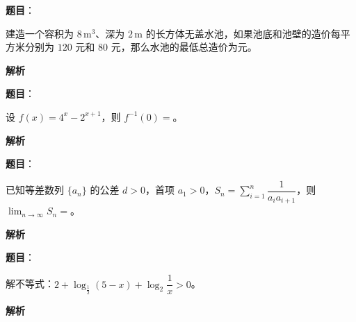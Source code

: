 \begin{answer}

\textbf{题目}：

建造一个容积为 $8\,\mathrm m^3$、深为 $2\,\mathrm m$ 的长方体无盖水池，如果池底和池壁的造价每平方米分别为 $120$ 元和 $80$ 元，那么水池的最低总造价为\underline{\qquad\qquad}元。

\textbf{解析}


\end{answer}
\begin{answer}

\textbf{题目}：

设 $f(x)=4^x-2^{x+1}$，则 $f^{-1}(0)=$\underline{\qquad\qquad}。

\textbf{解析}


\end{answer}
\begin{answer}

\textbf{题目}：

已知等差数列 $\{a_n\}$ 的公差 $d>0$，首项 $a_1>0$，$S_n=\displaystyle\sum_{i=1}^{n}\dfrac1{a_i a_{i+1}}$，则 $\displaystyle\lim_{n\to\infty}S_n=$\underline{\qquad\qquad}。

\textbf{解析}


\end{answer}
\begin{answer}

\textbf{题目}：

解不等式：$2+\log_{\frac12}(5-x)+\log_2\dfrac1x>0$。

\textbf{解析}


\end{answer}
